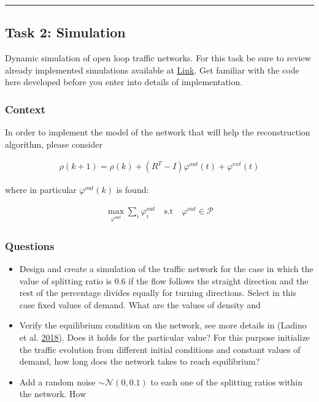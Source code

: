 \documentclass[]{book}
\providecommand{\tightlist}{%
  \setlength{\itemsep}{0pt}\setlength{\parskip}{0pt}}
\theoremstyle{definition}
\theoremstyle{definition}
\theoremstyle{definition}
\theoremstyle{remark}
\begin{document}
\begin{center}\rule{0.5\linewidth}{\linethickness}\end{center}

\hypertarget{task-2-simulation-1}{%
\subsection*{Task 2: Simulation}\label{task-2-simulation-1}}

Dynamic simulation of open loop traffic networks. For this task be sure
to review already implemented simulations available at
\href{https://github.com/aladinoster/density-reconstruction}{Link}. Get
familiar with the code here developed before you enter into details of
implementation.

\hypertarget{context-10}{%
\subsubsection*{Context}\label{context-10}}

In order to implement the model of the network that will help the
reconstruction algorithm, please consider

\begin{align}
\rho(k+1) = \rho(k) + (R^T - I)\varphi^{out}(t) + \varphi^{ext}(t) \label{eq:lwr}
\end{align}

where in particular \(\varphi^{out}(k)\) is found:

\begin{align}
\underset{\varphi^{out}}{\max} \sum_i \varphi^{out}_i\quad \text{s.t}\quad \varphi^{out} \in \mathcal{P}
\end{align}

\hypertarget{questions-9}{%
\subsubsection*{Questions}\label{questions-9}}

\begin{itemize}
\tightlist
\item
  Design and create a simulation of the traffic network for the case in
  which the value of splitting ratio is \(0.6\) if the flow follows the
  straight direction and the rest of the percentage divides equally for
  turning directions. Select in this case fixed values of demand. What
  are the values of density and
\item
  Verify the equilibrium condition on the network, see more details in
  (Ladino et al. \protect\hyperlink{ref-Ladino2018}{2018}). Does it
  holds for the particular value? For this purpose initialize the
  traffic evolution from different initial conditions and constant
  values of demand, how long does the network takes to reach
  equilibrium?
\item
  Add a random noise \(\sim \mathcal{N}(0,0.1)\) to each one of the
  splitting ratios within the network. How
\end{itemize}
\end{document}
